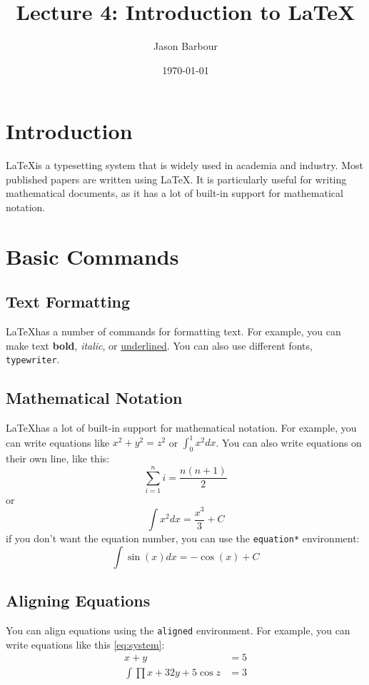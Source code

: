 \documentclass{article}
\title{Lecture 4: Introduction to \LaTeX}
\author{Jason Barbour}
\date{\today}
\begin{document}
\maketitle 
\tableofcontents
\newpage

\section{Introduction}
\LaTeX is a typesetting system that is widely used in academia and industry. Most published papers are written using \LaTeX. It is particularly useful for writing mathematical documents, as it has a lot of built-in support for mathematical notation.

\section{Basic Commands}
\subsection{Text Formatting}
\LaTeX has a number of commands for formatting text. For example, you can make text \textbf{bold}, \textit{italic}, or \underline{underlined}. You can also use different fonts, \texttt{typewriter}.

\subsection{Mathematical Notation}
\LaTeX has a lot of built-in support for mathematical notation. For example, you can write equations like $x^2 + y^2 = z^2$ or \(\int_0^1 x^2 dx\). You can also write equations on their own line, like this:
\[
\sum_{i=1}^n i = \frac{n(n+1)}{2}
\]
or 
\begin{equation}
\int x^2 dx = \frac{x^3}{3} + C
\end{equation}
if you don't want the equation number, you can use the \texttt{equation*} environment:
\begin{equation*}
\int \sin(x) dx = -\cos(x) + C
\end{equation*}

\subsection{Aligning Equations}
You can align equations using the \texttt{aligned} environment. For example, you can write equations like this \autoref{eq:system}:
\begin{equation}\label{eq:system}
    \begin{aligned}
        x + y &= 5 \\
        \int \prod x + 32 y + 5 \cos z &= 3
    \end{aligned}
\end{equation}
    
\end{document}
